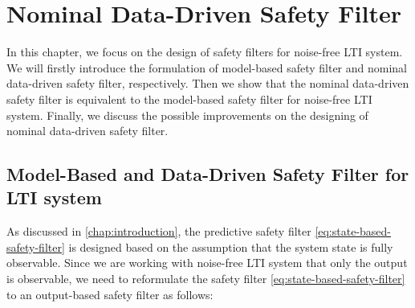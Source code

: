 \chapter{Nominal Data-Driven Safety Filter}\label{chap:nominal-ddsf}

In this chapter, we focus on the design of safety filters for noise-free LTI system.
We will firstly introduce the formulation of model-based safety filter and nominal data-driven safety filter, respectively.
Then we show that the nominal data-driven safety filter is equivalent to the model-based safety filter for noise-free LTI system.
Finally, we discuss the possible improvements on the designing of nominal data-driven safety filter.


\section{Model-Based and Data-Driven Safety Filter for LTI system}\label{sec:formulation-nominal}

As discussed in \cref{chap:introduction}, the predictive safety filter \cref{eq:state-based-safety-filter} is designed based on the assumption that the system state is fully observable.
Since we are working with noise-free LTI system that only the output is observable, we need to reformulate the safety filter \cref{eq:state-based-safety-filter} to an output-based safety filter as follows:

